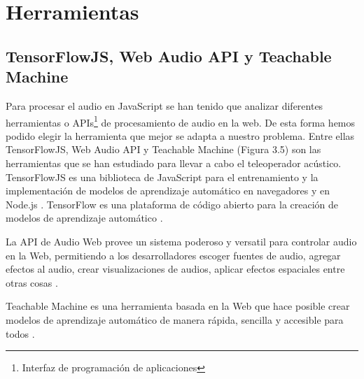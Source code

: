 \section{Herramientas}
\subsection{TensorFlowJS, Web Audio API y Teachable Machine}
Para procesar el audio en JavaScript se han tenido que analizar diferentes herramientas o APIs\footnote{Interfaz de programación de aplicaciones} de procesamiento de audio en la web. De esta forma hemos podido elegir la herramienta que mejor se adapta a nuestro problema.
Entre ellas TensorFlowJS, Web Audio API y Teachable Machine (Figura 3.5) son las herramientas que se han estudiado para llevar a cabo el teleoperador acústico.
\\
TensorFlowJS es una biblioteca de JavaScript para el entrenamiento y la implementación de modelos de aprendizaje automático en navegadores y en Node.js . TensorFlow es una plataforma de código abierto para la creación de modelos de aprendizaje automático \cite{tfjs}.

La API de Audio Web provee un sistema poderoso y versatil para controlar audio en la Web, permitiendo a los desarrolladores escoger fuentes de audio, agregar efectos al audio, crear visualizaciones de audios, aplicar efectos espaciales entre otras cosas \cite{waa}.

Teachable Machine es una herramienta basada en la Web que hace posible crear modelos de aprendizaje automático de manera rápida, sencilla y accesible para todos \cite{tm}.

